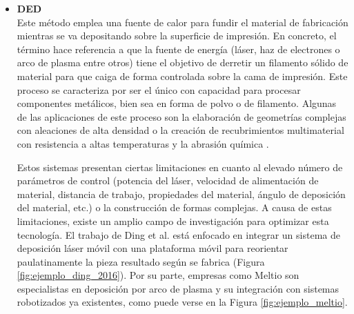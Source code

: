 \begin{itemize}
    \item \textbf{\acrfull{DED}}\\
    Este método emplea una fuente de calor para fundir el material de fabricación mientras se va depositando sobre la superficie de impresión. En concreto, el término hace referencia a que la fuente de energía (láser, haz de electrones o arco de plasma entre otros) tiene el objetivo de derretir un filamento sólido de material para que caiga de forma controlada sobre la cama de impresión. Este proceso se caracteriza por ser el único con capacidad para procesar componentes metálicos, bien sea en forma de polvo o de filamento. Algunas de las aplicaciones de este proceso son la elaboración de geometrías complejas con aleaciones de alta densidad \cite{Caiazzo_2018} o la creación de recubrimientos multimaterial con resistencia a altas temperaturas y la abrasión química \cite{Fujishima_2017}. 

    Estos sistemas presentan ciertas limitaciones en cuanto al elevado número de parámetros de control (potencia del láser, velocidad de alimentación de material, distancia de trabajo, propiedades del material, ángulo de deposición del material, etc.) o la construcción de formas complejas. A causa de estas limitaciones, existe un amplio campo de investigación para optimizar esta tecnología. El trabajo de Ding et al. \cite{Ding_2016} está enfocado en integrar un sistema de deposición láser móvil con una plataforma móvil para reorientar paulatinamente la pieza resultado según se fabrica (Figura \ref{fig:ejemplo_ding_2016}). Por su parte, empresas como Meltio \cite{Meltio_web} son especialistas en deposición por arco de plasma y su integración con sistemas robotizados ya existentes, como puede verse en la Figura \ref{fig:ejemplo_meltio}.


\end{itemize}
